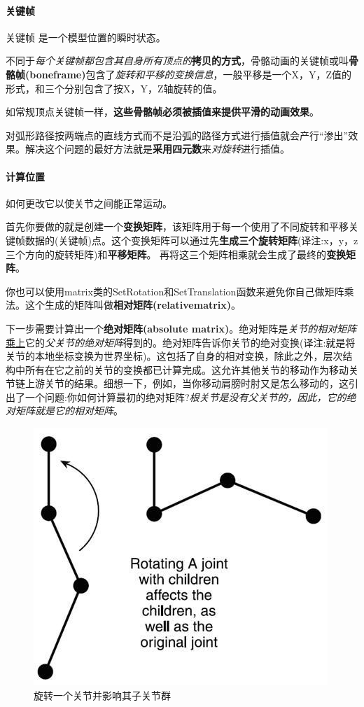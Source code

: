 \documentclass[UTF8,a4paper,12pt]{ctexbook}
\begin{document}
			\paragraph{关键帧}
				关键帧 是一个模型位置的瞬时状态。
			
				不同于\textit{每个关键帧都包含其自身所有顶点的}\textbf{拷贝的方式}，骨骼动画的关键帧或叫\textbf{骨骼帧(boneframe)}包含了\textit{旋转和平移的变换信息}，一般平移是一个X，Y，Z值的形式，和三个分别包含了按X，Y，Z轴旋转的值。
				
				如常规顶点关键帧一样，\textbf{这些骨骼帧必须被插值来提供平滑的动画效果}。
				
				对弧形路径按两端点的直线方式而不是沿弧的路径方式进行插值就会产行“渗出”效果。解决这个问题的最好方法就是\textbf{采用四元数}来\textit{对旋转}进行插值。
				
			\paragraph{计算位置}
				如何更改它以使关节之间能正常运动。
				
				首先你要做的就是创建一个\textbf{变换矩阵}，该矩阵用于每一个使用了不同旋转和平移关键帧数据的(关键帧)点。这个变换矩阵可以通过先\textbf{生成三个旋转矩阵}(译注:x，y，z三个方向的旋转矩阵)和\textbf{平移矩阵}。
				再将这三个矩阵相乘就会生成了最终的\textbf{变换矩阵}。
				
				你也可以使用matrix类的SetRotation和SetTranslation函数来避免你自己做矩阵乘法。这个生成的矩阵叫做\textbf{相对矩阵(relativematrix)}。
				
				下一步需要计算出一个\textbf{绝对矩阵(absolute matrix)}。绝对矩阵是\textit{关节的相对矩阵}\underline{乘上}它的\textit{父关节的绝对矩阵}得到的。绝对矩阵告诉你关节的绝对变换(译注:就是将关节的本地坐标变换为世界坐标)。这包括了自身的相对变换，除此之外，层次结构中所有在它之前的关节的变换都已计算完成。这允许其他关节的移动作为移动关节链上游关节的结果。细想一下，例如，当你移动肩膀时肘又是怎么移动的，这引出了一个问题:你如何计算最初的绝对矩阵?\textit{根关节是没有父关节的，因此，它的绝对矩阵就是它的相对矩阵}。
				
					\begin{figure}[H]
						\centering
						\includegraphics[width=.6\linewidth]{SkeletonTheory04}
						\caption{旋转一个关节并影响其子关节群}
					\end{figure}
					
\end{document}
